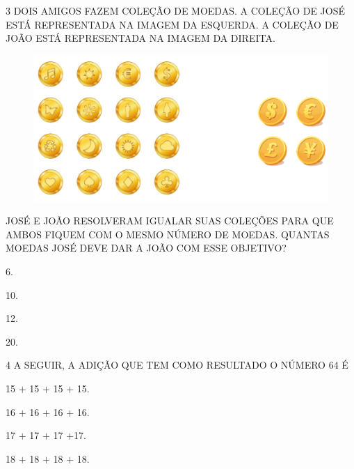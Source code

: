 \pagebreak
\num{3} DOIS AMIGOS FAZEM COLEÇÃO DE MOEDAS. A COLEÇÃO DE JOSÉ ESTÁ REPRESENTADA NA IMAGEM DA
ESQUERDA. A COLEÇÃO DE JOÃO ESTÁ REPRESENTADA NA IMAGEM DA DIREITA.


\begin{figure}[htpb!]
\includegraphics[width=\textwidth]{./media/SAEB_1ANO_MAT_FIGURA121.png}
\end{figure}

JOSÉ E JOÃO RESOLVERAM IGUALAR SUAS COLEÇÕES PARA QUE AMBOS FIQUEM COM O MESMO NÚMERO DE MOEDAS. QUANTAS MOEDAS JOSÉ DEVE DAR A JOÃO COM ESSE OBJETIVO?

\begin{escolha}[itemsep=0pt]
\item 6.

\item 10.

\item 12.

\item 20.
\end{escolha}

\num{4} A SEGUIR, A ADIÇÃO QUE TEM COMO RESULTADO O NÚMERO 64 É

\begin{escolha}[itemsep=0pt]
\item 15 $+$ 15 $+$ 15 $+$ 15.

\item 16 $+$ 16 $+$ 16 $+$ 16.

\item 17 $+$ 17 $+$ 17 $+$17.

\item 18 $+$ 18 $+$ 18 $+$ 18.
\end{escolha}

